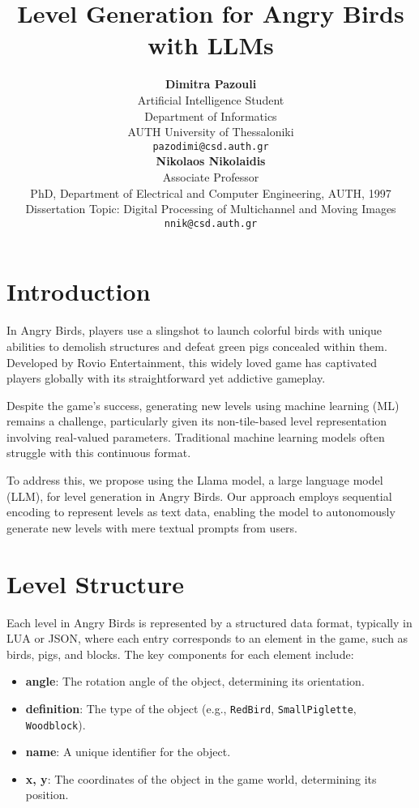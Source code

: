 \documentclass[twocolumn]{article}
\title{Level Generation for Angry Birds with LLMs}
\author{%
\begin{minipage}[t]{0.45\textwidth}
    \raggedright
    \compactauthor
    \textbf{Dimitra Pazouli}\\
    Artificial Intelligence Student\\
    Department of Informatics\\
    AUTH University of Thessaloniki\\
    \texttt{pazodimi@csd.auth.gr}
\end{minipage}%
\hfill
\begin{minipage}[t]{0.45\textwidth}
    \raggedleft
    \compactauthor
    \textbf{Nikolaos Nikolaidis}\\
    Associate Professor\\
    PhD, Department of Electrical and Computer Engineering, AUTH, 1997\\
    Dissertation Topic: Digital Processing of Multichannel and Moving Images\\
    \texttt{nnik@csd.auth.gr}
\end{minipage}
}
\date{}
\begin{document}
\maketitle






\section*{Introduction}
In Angry Birds, players use a slingshot to launch colorful birds with unique abilities to demolish structures and defeat green pigs concealed within them. Developed by Rovio Entertainment, this widely loved game has captivated players globally with its straightforward yet addictive gameplay.

Despite the game's success, generating new levels using machine learning (ML) remains a challenge, particularly given its non-tile-based level representation involving real-valued parameters. Traditional machine learning models often struggle with this continuous format.

To address this, we propose using the Llama model, a large language model (LLM), for level generation in Angry Birds. Our approach employs sequential encoding to represent levels as text data, enabling the model to autonomously generate new levels with mere textual prompts from users.



\section*{Level Structure}
Each level in Angry Birds is represented by a structured data format, typically in LUA or JSON, where each entry corresponds to an element in the game, such as birds, pigs, and blocks. The key components for each element include:

\begin{itemize}
    \item \textbf{angle}: The rotation angle of the object, determining its orientation.
    \item \textbf{definition}: The type of the object (e.g., \texttt{RedBird}, \texttt{SmallPiglette}, \texttt{Woodblock}).
    \item \textbf{name}: A unique identifier for the object.
    \item \textbf{x, y}: The coordinates of the object in the game world, determining its position.
\end{itemize}
\end{document}
